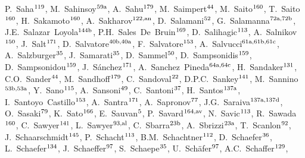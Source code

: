\begin{flushleft}
P.~Saha$^\textrm{\scriptsize 119}$,    
M.~Sahinsoy$^\textrm{\scriptsize 59a}$,    
A.~Sahu$^\textrm{\scriptsize 179}$,    
M.~Saimpert$^\textrm{\scriptsize 44}$,    
M.~Saito$^\textrm{\scriptsize 160}$,    
T.~Saito$^\textrm{\scriptsize 160}$,    
H.~Sakamoto$^\textrm{\scriptsize 160}$,    
A.~Sakharov$^\textrm{\scriptsize 122,an}$,    
D.~Salamani$^\textrm{\scriptsize 52}$,    
G.~Salamanna$^\textrm{\scriptsize 72a,72b}$,    
J.E.~Salazar~Loyola$^\textrm{\scriptsize 144b}$,    
P.H.~Sales~De~Bruin$^\textrm{\scriptsize 169}$,    
D.~Salihagic$^\textrm{\scriptsize 113}$,    
A.~Salnikov$^\textrm{\scriptsize 150}$,    
J.~Salt$^\textrm{\scriptsize 171}$,    
D.~Salvatore$^\textrm{\scriptsize 40b,40a}$,    
F.~Salvatore$^\textrm{\scriptsize 153}$,    
A.~Salvucci$^\textrm{\scriptsize 61a,61b,61c}$,    
A.~Salzburger$^\textrm{\scriptsize 35}$,    
J.~Samarati$^\textrm{\scriptsize 35}$,    
D.~Sammel$^\textrm{\scriptsize 50}$,    
D.~Sampsonidis$^\textrm{\scriptsize 159}$,    
D.~Sampsonidou$^\textrm{\scriptsize 159}$,    
J.~S\'anchez$^\textrm{\scriptsize 171}$,    
A.~Sanchez~Pineda$^\textrm{\scriptsize 64a,64c}$,    
H.~Sandaker$^\textrm{\scriptsize 131}$,    
C.O.~Sander$^\textrm{\scriptsize 44}$,    
M.~Sandhoff$^\textrm{\scriptsize 179}$,    
C.~Sandoval$^\textrm{\scriptsize 22}$,    
D.P.C.~Sankey$^\textrm{\scriptsize 141}$,    
M.~Sannino$^\textrm{\scriptsize 53b,53a}$,    
Y.~Sano$^\textrm{\scriptsize 115}$,    
A.~Sansoni$^\textrm{\scriptsize 49}$,    
C.~Santoni$^\textrm{\scriptsize 37}$,    
H.~Santos$^\textrm{\scriptsize 137a}$,    
I.~Santoyo~Castillo$^\textrm{\scriptsize 153}$,    
A.~Santra$^\textrm{\scriptsize 171}$,    
A.~Sapronov$^\textrm{\scriptsize 77}$,    
J.G.~Saraiva$^\textrm{\scriptsize 137a,137d}$,    
O.~Sasaki$^\textrm{\scriptsize 79}$,    
K.~Sato$^\textrm{\scriptsize 166}$,    
E.~Sauvan$^\textrm{\scriptsize 5}$,    
P.~Savard$^\textrm{\scriptsize 164,av}$,    
N.~Savic$^\textrm{\scriptsize 113}$,    
R.~Sawada$^\textrm{\scriptsize 160}$,    
C.~Sawyer$^\textrm{\scriptsize 141}$,    
L.~Sawyer$^\textrm{\scriptsize 93,al}$,    
C.~Sbarra$^\textrm{\scriptsize 23b}$,    
A.~Sbrizzi$^\textrm{\scriptsize 23a}$,    
T.~Scanlon$^\textrm{\scriptsize 92}$,    
J.~Schaarschmidt$^\textrm{\scriptsize 145}$,    
P.~Schacht$^\textrm{\scriptsize 113}$,    
B.M.~Schachtner$^\textrm{\scriptsize 112}$,    
D.~Schaefer$^\textrm{\scriptsize 36}$,    
L.~Schaefer$^\textrm{\scriptsize 134}$,    
J.~Schaeffer$^\textrm{\scriptsize 97}$,    
S.~Schaepe$^\textrm{\scriptsize 35}$,    
U.~Sch\"afer$^\textrm{\scriptsize 97}$,    
A.C.~Schaffer$^\textrm{\scriptsize 129}$,    

\end{flushleft}
